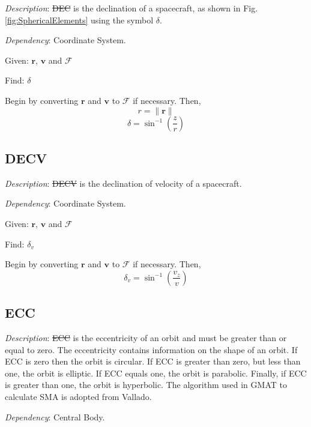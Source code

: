 \noindent \textit{Description}: \st{DEC} is the declination of a
spacecraft, as shown in Fig. \ref{fig:SphericalElements} using the
symbol $\delta$.

\noindent \textit{Dependency}:  Coordinate System.

\noindent Given:  $\mathbf{r}$, $\mathbf{v}$ and $\mathcal{F}$

\noindent Find:  $\delta$

Begin by converting  $\mathbf{r}$ and $\mathbf{v}$ to  $\mathcal{F}$
if necessary.  Then,
%
\begin{equation}
    r = \| \mathbf{r} \|
\end{equation}
%
\begin{equation}
    \delta = \sin^{-1}(\frac{z}{r})
\end{equation}

\subsection{DECV} 

\noindent \textit{Description}: \st{DECV} is the declination of
velocity of a spacecraft.

\noindent \textit{Dependency}:  Coordinate System.

\noindent Given:  $\mathbf{r}$, $\mathbf{v}$ and $\mathcal{F}$

\noindent Find:  $\delta_v$

Begin by converting  $\mathbf{r}$ and $\mathbf{v}$ to  $\mathcal{F}$
if necessary.  Then,
%
\begin{equation}
       \delta_v = \sin^{-1}(\frac{v_z}{v})
\end{equation}

\subsection{ECC} 

\noindent \textit{Description}: \st{ECC} is the eccentricity  of an
orbit and must be greater than or equal to zero. The eccentricity
contains information on the shape of an orbit. If ECC is zero then
the orbit is circular.  If ECC is greater than zero, but less than
one, the orbit is elliptic. If ECC equals one, the orbit is
parabolic. Finally, if ECC is greater than one, the orbit is
hyperbolic.  The algorithm used in GMAT to calculate SMA is adopted
from Vallado\cite{vallado2}.

\noindent \textit{Dependency}:  Central Body.

